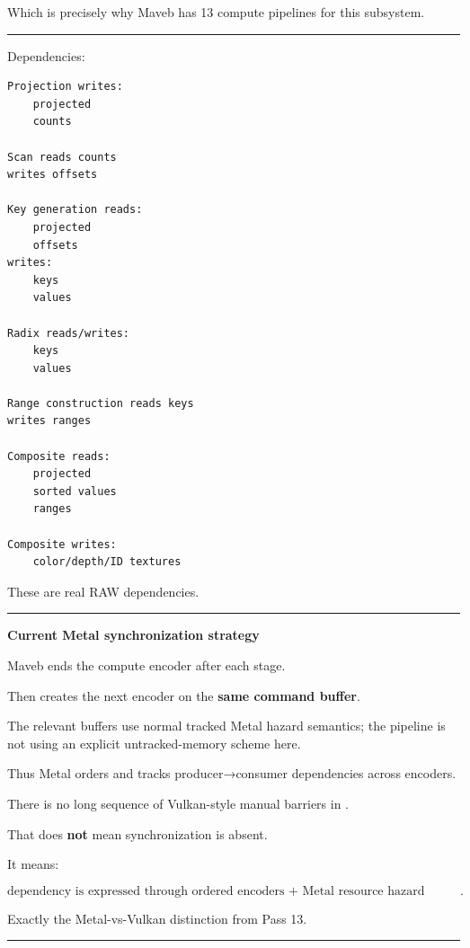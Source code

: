 Which is precisely why Maveb has 13 compute pipelines for this subsystem.

\begin{center}\rule{0.5\linewidth}{0.5pt}\end{center}

Dependencies:

\protect{}\label{sd09sx}%
\begin{verbatim}
Projection writes:
    projected
    counts

Scan reads counts
writes offsets

Key generation reads:
    projected
    offsets
writes:
    keys
    values

Radix reads/writes:
    keys
    values

Range construction reads keys
writes ranges

Composite reads:
    projected
    sorted values
    ranges

Composite writes:
    color/depth/ID textures
\end{verbatim}

These are real RAW dependencies.

\begin{center}\rule{0.5\linewidth}{0.5pt}\end{center}

\textbf{Current Metal synchronization strategy}

Maveb ends the compute encoder after each stage.

Then creates the next encoder on the \textbf{same command buffer}.

The relevant buffers use normal tracked Metal hazard semantics; the pipeline is not using an explicit untracked-memory scheme here.

Thus Metal orders and tracks producer→consumer dependencies across encoders.

There is no long sequence of Vulkan-style manual barriers in .

That does \textbf{not} mean synchronization is absent.

It means:

\[
\boxed{
\text{dependency is expressed through ordered encoders + Metal resource hazard tracking}.
}
\]

Exactly the Metal-vs-Vulkan distinction from Pass 13.

\begin{center}\rule{0.5\linewidth}{0.5pt}\end{center}

